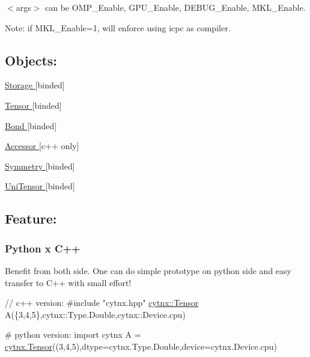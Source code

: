 $<$args$>$ can be O\+M\+P\+\_\+\+Enable, G\+P\+U\+\_\+\+Enable, D\+E\+B\+U\+G\+\_\+\+Enable, M\+K\+L\+\_\+\+Enable.

Note\+: if M\+K\+L\+\_\+\+Enable=1, will enforce using icpc as compiler.

\subsection*{Objects\+:}


\begin{DoxyItemize}
\item \hyperlink{classcytnx_1_1Storage}{Storage } \mbox{[}binded\mbox{]}
\item \hyperlink{classcytnx_1_1Tensor}{Tensor } \mbox{[}binded\mbox{]}
\item \hyperlink{classcytnx_1_1Bond}{Bond } \mbox{[}binded\mbox{]}
\item \hyperlink{classcytnx_1_1Accessor}{Accessor } \mbox{[}c++ only\mbox{]}
\item \hyperlink{classcytnx_1_1Symmetry}{Symmetry } \mbox{[}binded\mbox{]}
\item \hyperlink{classcytnx_1_1UniTensor}{Uni\+Tensor } \mbox{[}binded\mbox{]}
\end{DoxyItemize}

\subsection*{Feature\+:}

\subsubsection*{Python x C++}

Benefit from both side. One can do simple prototype on python side and easy transfer to C++ with small effort!


\begin{DoxyCode}
\textcolor{comment}{// c++ version:}
\textcolor{preprocessor}{#include "cytnx.hpp"}
\hyperlink{classcytnx_1_1Tensor}{cytnx::Tensor} A(\{3,4,5\},cytnx::Type.Double,cytnx::Device.cpu)
\end{DoxyCode}



\begin{DoxyCode}
\textcolor{comment}{# python version:}
\textcolor{keyword}{import} cytnx
A =  \hyperlink{classcytnx_1_1Tensor}{cytnx.Tensor}((3,4,5),dtype=cytnx.Type.Double,device=cytnx.Device.cpu)
\end{DoxyCode}


